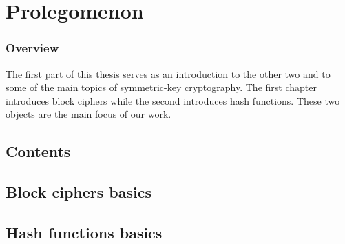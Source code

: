 \part[Prolégomènes]
	{Prolegomenon}
\label{part:prolego}

\section*{Overview}

The first part of this thesis serves as an introduction to the other two and to some of the
main topics of symmetric-key cryptography. The first chapter introduces block ciphers
while the second introduces hash functions. These two objects are the main focus of our work.



\cleardoublepage
\chapter*{Contents}
\parttoc


\chapter[Introduction aux chiffres par bloc]{Block ciphers basics}
\label{cha:block_intro}



\chapter[Introduction aux fonctions de hachage]{Hash functions basics}
\label{chap:hashfun}

